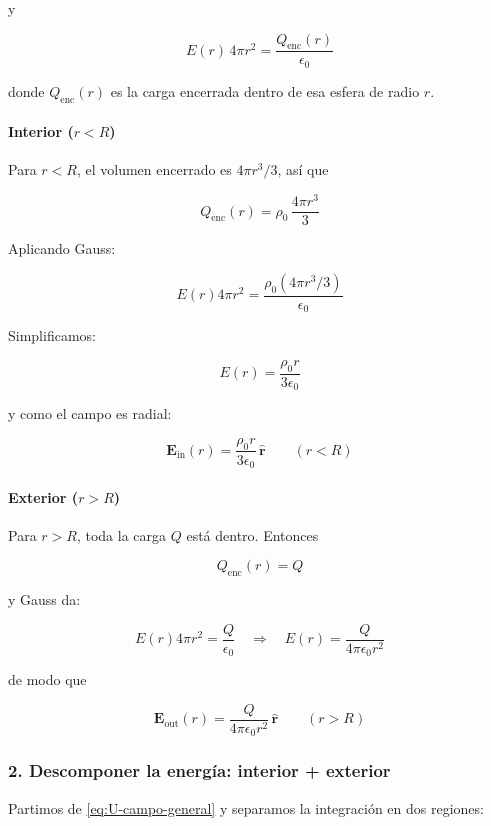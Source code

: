 \documentclass{article}
\begin{document}
y

\[
E(r)\,4\pi r^{2} = \frac{Q_{\text{enc}}(r)}{\epsilon_{0}}
\]

donde $Q_{\text{enc}}(r)$ es la carga encerrada dentro de esa esfera de radio $r$.

\paragraph{Interior ($r<R$)}

Para $r<R$, el volumen encerrado es $4\pi r^{3}/3$, así que

\[
Q_{\text{enc}}(r) = \rho_{0}\,\frac{4\pi r^{3}}{3}
\]

Aplicando Gauss:

\[
E(r)4\pi r^{2} = \frac{\rho_{0}(4\pi r^{3}/3)}{\epsilon_{0}}
\]

Simplificamos:

\[
E(r) = \frac{\rho_{0}r}{3\epsilon_{0}}
\]

y como el campo es radial:

\begin{equation}
\mathbf{E}_{\text{in}}(r) = \frac{\rho_{0}r}{3\epsilon_{0}}\,\hat{\mathbf{r}}
\qquad (r<R)
\label{eq:E-in}
\end{equation}

\paragraph{Exterior ($r>R$)}

Para $r>R$, toda la carga $Q$ está dentro. Entonces

\[
Q_{\text{enc}}(r) = Q
\]

y Gauss da:

\[
E(r)4\pi r^{2} = \frac{Q}{\epsilon_{0}}
\quad\Longrightarrow\quad
E(r) = \frac{Q}{4\pi\epsilon_{0}r^{2}}
\]

de modo que

\begin{equation}
\mathbf{E}_{\text{out}}(r) = \frac{Q}{4\pi\epsilon_{0}r^{2}}\,\hat{\mathbf{r}}
\qquad (r>R)
\label{eq:E-out}
\end{equation}

\subsubsection*{2. Descomponer la energía: interior + exterior}

Partimos de \eqref{eq:U-campo-general} y separamos la integración en dos regiones:
\end{document}
